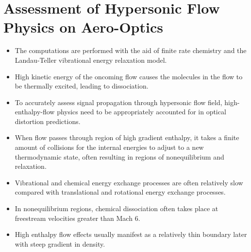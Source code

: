     \section{Assessment of Hypersonic Flow Physics on Aero-Optics \cite{mackey:aiaa:2019}} 
        \begin{itemize} 
            \item The computations are performed with the aid of finite rate chemistry and the Landau-Teller vibrational energy relaxation model. 
            \item High kinetic energy of the oncoming flow causes the molecules in the flow to be thermally excited, leading to dissociation. 
            \item To accurately assess signal propagation through hypersonic flow field, high-enthalpy-flow physics need to be appropriately accounted for in optical distortion predictions. 
            \item When flow passes through region of high gradient enthalpy, it takes a finite amount of collisions for the internal energies to adjust to a new thermodynamic state, often resulting in regions of nonequilibrium and relaxation.  
            \item Vibrational and chemical energy exchange processes are often relatively slow compared with translational and rotational energy exchange processes. 
            \item In nonequilibrium regions, chemical dissociation often takes place at freestream velocities greater than Mach $6$. 
            \item High enthalpy flow effects usually manifest as a relatively thin boundary later with steep gradient in density. 
        \end{itemize}


